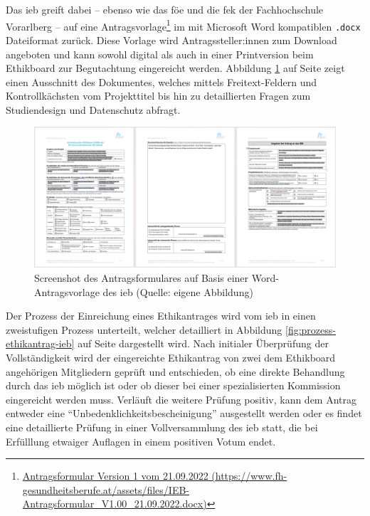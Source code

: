 \documentclass[a4paper,12pt,twoside]{scrreprt}
\begin{document}
Das \ac{ieb} greift dabei -- ebenso wie das \ac{föe} und die \ac{fek} der Fachhochschule Vorarlberg -- auf eine Antragsvorlage\footnote{\href{https://www.fh-gesundheitsberufe.at/assets/files/IEB-Antragsformular_V1.00_21.09.2022.docx}{Antragsformular Version 1 vom 21.09.2022 (\url{https://www.fh-gesundheitsberufe.at/assets/files/IEB-Antragsformular_V1.00_21.09.2022.docx)}}} im mit Microsoft Word kompatiblen \texttt{.docx} Dateiformat zurück. Diese Vorlage wird Antragssteller:innen zum Download angeboten und kann sowohl digital als auch in einer Printversion beim Ethikboard zur Begutachtung eingereicht werden. \cite{fh_gesundheitsberufe_oo_gmbh_einreichung_2023} Abbildung \ref{fig:dokumentenvorlage-ieb} auf Seite \pageref{fig:dokumentenvorlage-ieb} zeigt einen Ausschnitt des Dokumentes, welches mittels Freitext-Feldern und Kontrollkächsten vom Projekttitel bis hin zu detaillierten Fragen zum Studiendesign und Datenschutz abfragt.

\begin{figure}[ht]
    \centering
    \includegraphics[scale=0.21]{thesis/images/Luidold_Word-Vorlage-IEB-FH-Gesundheitsberufe-OOE.png}
    \caption[Screenshot der Word-Antragsvorlage des Institutionellen Ethikboards der FH Gesundheitsberufe OÖ]{Screenshot des Antragsformulares auf Basis einer Word-Antragsvorlage des \ac{ieb} (Quelle: eigene Abbildung)}
    \label{fig:dokumentenvorlage-ieb}
\end{figure}

Der Prozess der Einreichung eines Ethikantrages wird vom \ac{ieb} in einen zweistufigen Prozess unterteilt, welcher detailliert in Abbildung \ref{fig:prozess-ethikantrag-ieb} auf Seite \pageref{fig:prozess-ethikantrag-ieb} dargestellt wird. Nach initialer Überprüfung der Vollständigkeit wird der eingereichte Ethikantrag von zwei dem Ethikboard angehörigen Mitgliedern geprüft und entschieden, ob eine direkte Behandlung durch das \ac{ieb} möglich ist oder ob dieser bei einer spezialisierten Kommission eingereicht werden muss. Verläuft die weitere Prüfung positiv, kann dem Antrag entweder eine \enquote{Unbedenklichkeitsbescheinigung} ausgestellt werden oder es findet eine detaillierte Prüfung in einer Vollversammlung des \ac{ieb} statt, die bei Erfülllung etwaiger Auflagen in einem positiven Votum endet. \cite{fh_gesundheitsberufe_oo_gmbh_einreichung_2023}
\end{document}
